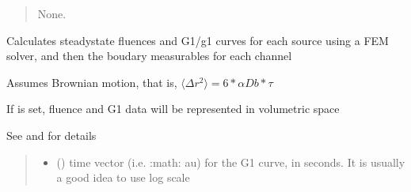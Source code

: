 \documentclass[letterpaper,10pt,english]{sphinxmanual}
\begin{document}
\begin{fulllineitems}
\begin{fulllineitems}
\begin{quote}
\begin{description}
\begin{itemize}
\end{itemize}

\sphinxAtStartPar
None.

\end{description}\end{quote}

\end{fulllineitems}


\begin{fulllineitems}
\label{\detokenize{_autosummary/nirfasterff.base.dcs_mesh.dcsmesh:nirfasterff.base.dcs_mesh.dcsmesh.femdata}}
\pysigstartsignatures
{}
\pysigstopsignatures
\sphinxAtStartPar
Calculates steady\sphinxhyphen{}state fluences and G1/g1 curves for each source using a FEM solver, and then the boudary measurables for each channel

\sphinxAtStartPar
Assumes Brownian motion, that is, \(\langle\Delta r^2\rangle=6*\alpha Db*\tau\)

\sphinxAtStartPar
If  is set, fluence and G1 data will be represented in volumetric space

\sphinxAtStartPar
See {\hyperref[\detokenize{_autosummary/nirfasterff.forward.femdata.femdata_DCS:nirfasterff.forward.femdata.femdata_DCS}]{}} and {\hyperref[\detokenize{_autosummary/nirfasterff.forward.femdata.femdata_stnd_CW:nirfasterff.forward.femdata.femdata_stnd_CW}]{}} for details
\begin{quote}\begin{description}
\begin{itemize}
\item {} 
\sphinxAtStartPar
{} () \textendash{} time vector (i.e. :math:\textasciigrave{}   au\textasciigrave{}) for the G1 curve, in seconds. It is usually a good idea to use log scale


\end{itemize}
\end{description}
\end{quote}
\end{fulllineitems}
\end{fulllineitems}
\end{document}
